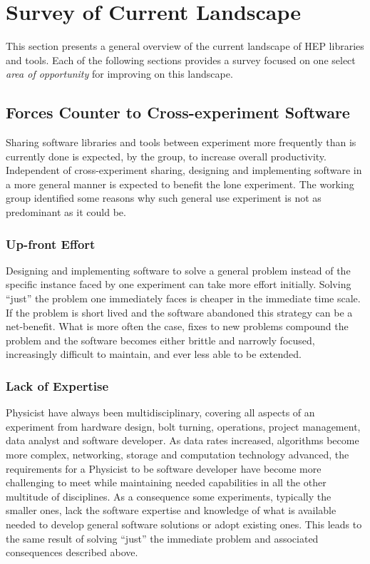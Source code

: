 \section{Survey of Current Landscape}

This section presents a general overview of the current landscape of
HEP libraries and tools.  Each of the following sections provides a
survey focused on one select \textit{area of opportunity} for
improving on this landscape.

\subsection{Forces Counter to Cross-experiment Software}

Sharing software libraries and tools between experiment more
frequently than is currently done is expected, by the group, to
increase overall productivity.  Independent of cross-experiment
sharing, designing and implementing software in a more general manner
is expected to benefit the lone experiment.  The working group
identified some reasons why such general use experiment is not as
predominant as it could be.

\subsubsection{Up-front Effort}

Designing and implementing software to solve a general problem instead
of the specific instance faced by one experiment can take more effort
initially.  Solving ``just'' the problem one immediately faces is
cheaper in the immediate time scale.  If the problem is short lived
and the software abandoned this strategy can be a net-benefit.  What
is more often the case, fixes to new problems compound the problem and
the software becomes either brittle and narrowly focused, increasingly
difficult to maintain, and ever less able to be extended.

\subsubsection{Lack of Expertise}

Physicist have always been multidisciplinary, covering all aspects of
an experiment from hardware design, bolt turning, operations, project
management, data analyst and software developer.  As data rates
increased, algorithms become more complex, networking, storage and
computation technology advanced, the requirements for a Physicist to
be software developer have become more challenging to meet while
maintaining needed capabilities in all the other multitude of
disciplines.  As a consequence some experiments, typically the smaller
ones, lack the software expertise and knowledge of what is available
needed to develop general software solutions or adopt existing ones.
This leads to the same result of solving ``just'' the immediate
problem and associated consequences described above.


